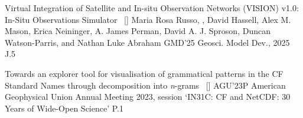
\begin{publications}

\publication
	{Virtual Integration of Satellite and In-situ Observation Networks (VISION) v1.0: In-Situ Observations Simulator}{~ [\href{https://gmd.copernicus.org/articles/18/181/2025/}{\small{\linkSymbol}}]}
	{Maria Rosa Russo, \underline{}, David Hassell, Alex M. Mason, Erica Neininger, A. James Perman, David A. J. Sproson, Duncan Watson-Parris, and Nathan Luke Abraham}
	{GMD'25} {Geosci. Model Dev., 2025} {J.5}

\publication
	{Towards an explorer tool for visualisation of grammatical patterns in the CF Standard Names through decomposition into \textit{n}-grams}{~ [\href{https://figshare.com/articles/poster/Towards_an_explorer_tool_for_visualisation_of_grammatical_patterns_in_the_CF_Standard_Names_through_decomposition_into_i_n_i_-grams/24750393?file=43484889}{\small{\linkSymbol}}]}
	{\underline{}}
	{AGU'23P} {American Geophysical Union Annual Meeting 2023, session `IN31C: CF and NetCDF: 30 Years of Wide-Open Science'} {P.1}

\end{publications}
